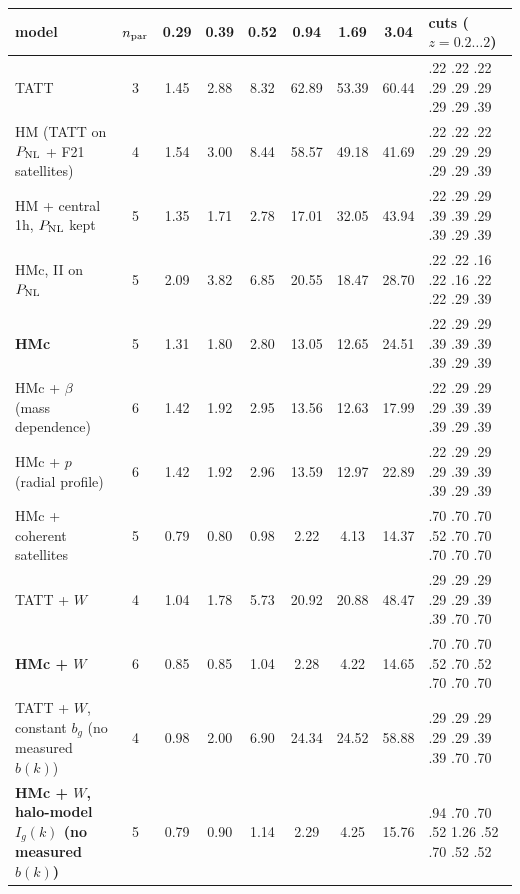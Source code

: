 \begin{tabular}{l c cccccc l}\toprule
model & $n_{\rm par}$ & 0.29 & 0.39 & 0.52 & 0.94 & 1.69 & 3.04 & cuts ($z = 0.2 \ldots 2$)\\ \midrule
TATT & 3 & 1.45 & 2.88 & 8.32 & 62.89 & 53.39 & 60.44 & .22 .22 .22 .29 .29 .29 .29 .29 .39\\
HM (TATT on $P_{\rm NL}$ + F21 satellites) & 4 & 1.54 & 3.00 & 8.44 & 58.57 & 49.18 & 41.69 & .22 .22 .22 .29 .29 .29 .29 .29 .39\\
\addlinespace
HM + central 1h, $P_{\rm NL}$ kept & 5 & 1.35 & 1.71 & 2.78 & 17.01 & 32.05 & 43.94 & .22 .29 .29 .39 .39 .29 .39 .29 .39\\
HMc, II on $P_{\rm NL}$ & 5 & 2.09 & 3.82 & 6.85 & 20.55 & 18.47 & 28.70 & .22 .22 .16 .22 .16 .22 .22 .29 .39\\
\textbf{HMc} & 5 & 1.31 & 1.80 & 2.80 & 13.05 & 12.65 & 24.51 & .22 .29 .29 .39 .39 .39 .39 .29 .39\\
\addlinespace
HMc + $\beta$ (mass dependence) & 6 & 1.42 & 1.92 & 2.95 & 13.56 & 12.63 & 17.99 & .22 .29 .29 .29 .39 .39 .39 .29 .39\\
HMc + $p$ (radial profile) & 6 & 1.42 & 1.92 & 2.96 & 13.59 & 12.97 & 22.89 & .22 .29 .29 .29 .39 .39 .39 .29 .39\\
HMc + coherent satellites & 5 & 0.79 & 0.80 & 0.98 & 2.22 & 4.13 & 14.37 & .70 .70 .70 .52 .70 .70 .70 .70 .70\\
\addlinespace
TATT + $W$ & 4 & 1.04 & 1.78 & 5.73 & 20.92 & 20.88 & 48.47 & .29 .29 .29 .29 .29 .39 .39 .70 .70\\
\textbf{HMc + $W$} & 6 & 0.85 & 0.85 & 1.04 & 2.28 & 4.22 & 14.65 & .70 .70 .70 .52 .70 .52 .70 .70 .70\\
\addlinespace
TATT + $W$, constant $b_g$ (no measured $b(k)$) & 4 & 0.98 & 2.00 & 6.90 & 24.34 & 24.52 & 58.88 & .29 .29 .29 .29 .29 .39 .39 .70 .70\\
\textbf{HMc + $W$, halo-model $I_g(k)$ (no measured $b(k)$)} & 5 & 0.79 & 0.90 & 1.14 & 2.29 & 4.25 & 15.76 & .94 .70 .70 .52 1.26 .52 .70 .52 .52\\
\bottomrule\end{tabular}
